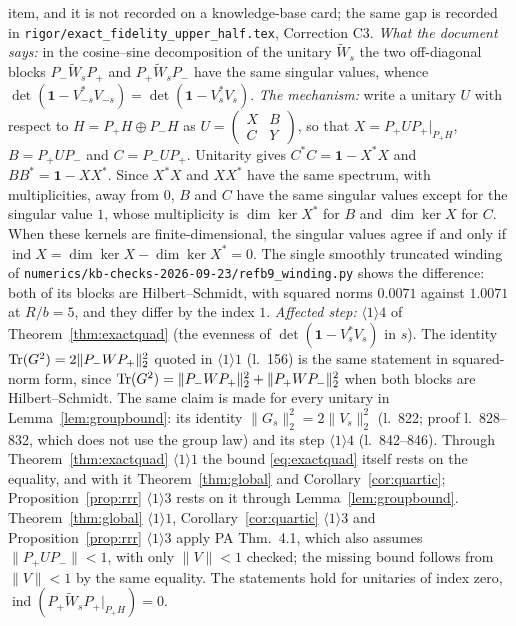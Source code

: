 \documentclass[11pt]{article}
\newcommand{\Wt}{\widetilde W}
\newcommand{\Pp}{P_+}\newcommand{\Pm}{P_-}
\newcommand{\one}{\mathbf 1}
\newcommand{\norm}[1]{\lVert#1\rVert}
\begin{document}
\begin{enumerate}[label=(C\arabic*),ref=C\arabic*,leftmargin=3em]
 item, and it is not recorded on a knowledge-base card; the same gap is recorded in
 \texttt{rigor/exact\_fidelity\_upper\_half.tex}, Correction C3.
 \emph{What the document says:} in the cosine--sine decomposition of the unitary $\Wt_s$ the two
 off-diagonal blocks $\Pm\Wt_s\Pp$ and $\Pp\Wt_s\Pm$ have the same singular values, whence
 $\det(\one-V_{-s}^*V_{-s})=\det(\one-V_s^*V_s)$.
 \emph{The mechanism:} write a unitary $U$ with respect to $H=\Pp H\oplus\Pm H$ as
 $U=\begin{pmatrix}X&B\\ C&Y\end{pmatrix}$, so that $X=\Pp U\Pp|_{\Pp H}$, $B=\Pp U\Pm$ and
 $C=\Pm U\Pp$.  Unitarity gives $C^*C=\one-X^*X$ and $BB^*=\one-XX^*$.  Since $X^*X$ and $XX^*$ have
 the same spectrum, with multiplicities, away from $0$, $B$ and $C$ have the same singular values
 except for the singular value $1$, whose multiplicity is $\dim\ker X^*$ for $B$ and $\dim\ker X$
 for $C$.  When these kernels are finite-dimensional, the singular values agree if and only if
 $\operatorname{ind}X=\dim\ker X-\dim\ker X^*=0$.  The single smoothly truncated winding of
 \texttt{numerics/kb-checks-2026-09-23/refb9\_winding.py} shows the difference: both of its blocks
 are Hilbert--Schmidt, with squared norms $0.0071$ against $1.0071$ at $R/b=5$, and they differ by
 the index $1$.
 \emph{Affected step:} $\langle1\rangle4$ of Theorem~\ref{thm:exactquad} (the evenness of
 $\det(\one-V_s^*V_s)$ in $s$).  The identity $\Tr(G^2)=2\norm{\Pm W\Pp}_2^2$ quoted in
 $\langle1\rangle1$ (l.~156) is the same statement in squared-norm form, since
 $\Tr(G^2)=\norm{\Pm W\Pp}_2^2+\norm{\Pp W\Pm}_2^2$ when both blocks are Hilbert--Schmidt.  The same
 claim is made for every unitary in Lemma~\ref{lem:groupbound}: its identity
 $\norm{G_s}_2^2=2\norm{V_s}_2^2$ (l.~822; proof l.~828--832, which does not use the group law) and
 its step $\langle1\rangle4$ (l.~842--846).  Through Theorem~\ref{thm:exactquad} $\langle1\rangle1$
 the bound \eqref{eq:exactquad} itself rests on the equality, and with it Theorem~\ref{thm:global}
 and Corollary~\ref{cor:quartic}; Proposition~\ref{prop:rrr} $\langle1\rangle3$ rests on it through
 Lemma~\ref{lem:groupbound}.  Theorem~\ref{thm:global} $\langle1\rangle1$,
 Corollary~\ref{cor:quartic} $\langle1\rangle3$ and Proposition~\ref{prop:rrr} $\langle1\rangle3$
 apply PA Thm.~4.1, which also assumes $\norm{\Pp U\Pm}<1$, with only $\norm V<1$ checked; the
 missing bound follows from $\norm V<1$ by the same equality.  The
 statements hold for unitaries of index zero, $\operatorname{ind}(\Pp\Wt_s\Pp|_{\Pp H})=0$.

\end{enumerate}
\end{document}
